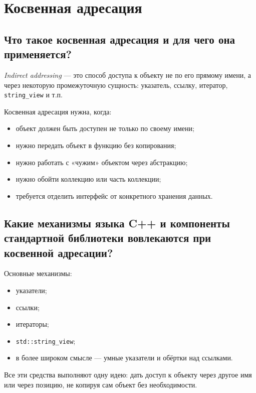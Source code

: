 \section{Косвенная адресация}

\subsection{Что такое косвенная адресация и для чего она применяется?}
\begin{definition}
\textit{Indirect addressing} — это способ доступа к объекту не по его прямому имени, а через некоторую промежуточную сущность: указатель, ссылку, итератор, \texttt{string\_view} и т.п.
\end{definition}

Косвенная адресация нужна, когда:
\begin{itemize}
    \item объект должен быть доступен не только по своему имени;
    \item нужно передать объект в функцию без копирования;
    \item нужно работать с «чужим» объектом через абстракцию;
    \item нужно обойти коллекцию или часть коллекции;
    \item требуется отделить интерфейс от конкретного хранения данных.
\end{itemize}

\subsection{Какие механизмы языка C++ и компоненты стандартной библиотеки вовлекаются при косвенной адресации?}
Основные механизмы:
\begin{itemize}
    \item указатели;
    \item ссылки;
    \item итераторы;
    \item \texttt{std::string\_view};
    \item в более широком смысле — умные указатели и обёртки над ссылками.
\end{itemize}

\begin{remark}
Все эти средства выполняют одну идею: дать доступ к объекту через другое имя или через позицию, не копируя сам объект без необходимости.
\end{remark}


